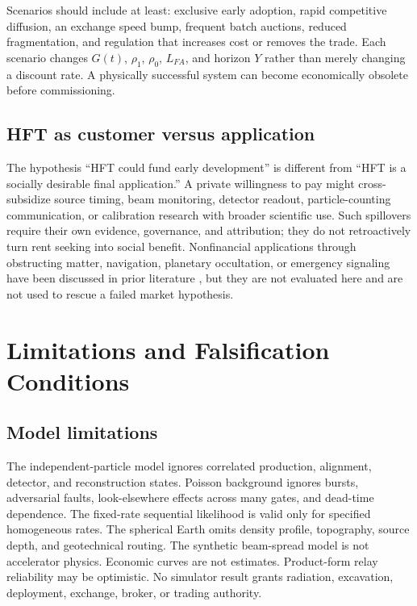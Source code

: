 \documentclass[11pt]{article}
\begin{document}
Scenarios should include at least: exclusive early adoption, rapid competitive diffusion, an exchange speed bump, frequent batch auctions, reduced fragmentation, and regulation that increases cost or removes the trade. Each scenario changes $G(t)$, $\rho_1$, $\rho_0$, $L_{FA}$, and horizon $Y$ rather than merely changing a discount rate. A physically successful system can become economically obsolete before commissioning.

\subsection{HFT as customer versus application}

The hypothesis ``HFT could fund early development'' is different from ``HFT is a socially desirable final application.'' A private willingness to pay might cross-subsidize source timing, beam monitoring, detector readout, particle-counting communication, or calibration research with broader scientific use. Such spillovers require their own evidence, governance, and attribution; they do not retroactively turn rent seeking into social benefit. Nonfinancial applications through obstructing matter, navigation, planetary occultation, or emergency signaling have been discussed in prior literature \citep{Stancil2012,Huber2010}, but they are not evaluated here and are not used to rescue a failed market hypothesis.

\section{Limitations and Falsification Conditions}

\subsection{Model limitations}

The independent-particle model ignores correlated production, alignment, detector, and reconstruction states. Poisson background ignores bursts, adversarial faults, look-elsewhere effects across many gates, and dead-time dependence. The fixed-rate sequential likelihood is valid only for specified homogeneous rates. The spherical Earth omits density profile, topography, source depth, and geotechnical routing. The synthetic beam-spread model is not accelerator physics. Economic curves are not estimates. Product-form relay reliability may be optimistic. No simulator result grants radiation, excavation, deployment, exchange, broker, or trading authority.
\end{document}
